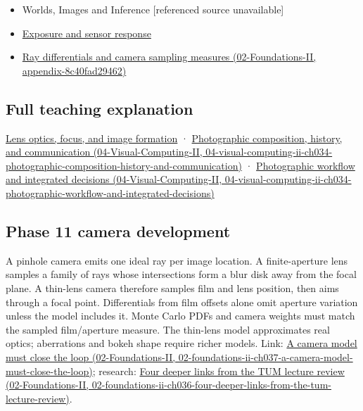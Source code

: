 \begin{itemize}
\item
  {Worlds, Images and Inference {[}referenced source unavailable{]}}
\item
  \hyperref[appendix-92d45cdf2afc]{Exposure and sensor response}
\item
  \href{../02-Foundations-II/main.pdf\#nameddest=appendix-8c40fad29462}{Ray differentials and camera sampling measures (02-Foundations-II, appendix-8c40fad29462)}
\end{itemize}

\subsection{Full teaching explanation}\label{appendix-21f8456e2629-full-teaching-explanation}

\hyperref[03-visual-computing-i-ch003-lens-optics-focus-and-image-formation]{Lens optics, focus, and image formation} · \href{../04-Visual-Computing-II/main.pdf\#nameddest=04-visual-computing-ii-ch034-photographic-composition-history-and-communication}{Photographic composition, history, and communication (04-Visual-Computing-II, 04-visual-computing-ii-ch034-photographic-composition-history-and-communication)} · \href{../04-Visual-Computing-II/main.pdf\#nameddest=04-visual-computing-ii-ch034-photographic-workflow-and-integrated-decisions}{Photographic workflow and integrated decisions (04-Visual-Computing-II, 04-visual-computing-ii-ch034-photographic-workflow-and-integrated-decisions)}

\subsection{Phase 11 camera development}\label{appendix-21f8456e2629-phase-11-camera-development}

A pinhole camera emits one ideal ray per image location. A finite-aperture lens samples a family of rays whose intersections form a blur disk away from the focal plane. A thin-lens camera therefore samples film and lens position, then aims through a focal point. Differentials from film offsets alone omit aperture variation unless the model includes it. Monte Carlo PDFs and camera weights must match the sampled film/aperture measure. The thin-lens model approximates real optics; aberrations and bokeh shape require richer models. Link: \href{../02-Foundations-II/main.pdf\#nameddest=02-foundations-ii-ch037-a-camera-model-must-close-the-loop}{A camera model must close the loop (02-Foundations-II, 02-foundations-ii-ch037-a-camera-model-must-close-the-loop)}; research: \href{../02-Foundations-II/main.pdf\#nameddest=02-foundations-ii-ch036-four-deeper-links-from-the-tum-lecture-review}{Four deeper links from the TUM lecture review (02-Foundations-II, 02-foundations-ii-ch036-four-deeper-links-from-the-tum-lecture-review)}.
